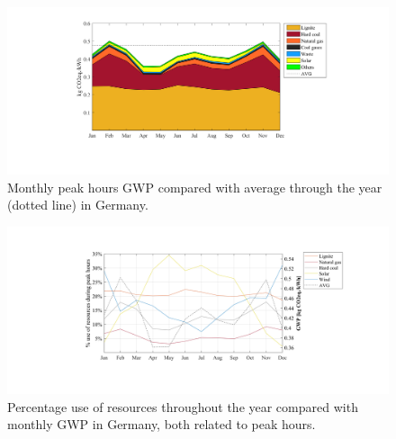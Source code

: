 {\begin{figure}[]
	\centering
	\hspace*{-1cm}\includegraphics[width=1.2\textwidth]{ChapterLCA/Images/GWP_plots/Germany_GWP.png}
	\vspace*{-20mm}
	\caption{Monthly peak hours GWP compared with average through the year (dotted line) in Germany.}
	\label{GWP_DE}
\end{figure}
	
\begin{figure}[]
	\centering
		\hspace*{-1.6cm}\includegraphics[width=1.2\textwidth]{ChapterLCA/Images/GWP_plots/COMP_GWP_DE.png}
	\vspace*{-20mm}
	\caption{Percentage use of resources throughout the year compared with monthly GWP in Germany, both related to peak hours.}
	\label{COMP_GE}
\end{figure}

}
